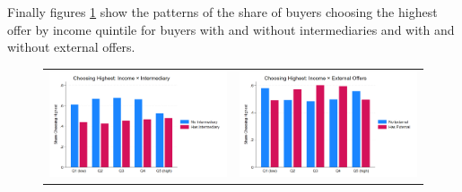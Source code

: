 \documentclass[12pt]{article}
\begin{document}
Finally figures \ref{fig:ie4_12and13} show the patterns of the share of buyers choosing the highest offer by income quintile for buyers with and without intermediaries and with and without external offers.
  \begin{figure}[H]
\caption{}
 \label{fig:ie4_12and13}
\centering{}%
\begin{tabular}{cc}
\includegraphics[scale=0.17]{../figures/IE4/IE4_highest_income_intermediary.png} & \includegraphics[scale=0.17]{../figures/IE4/IE4_highest_income_external.png} 
\end{tabular}
\end{figure} 



\end{document}
